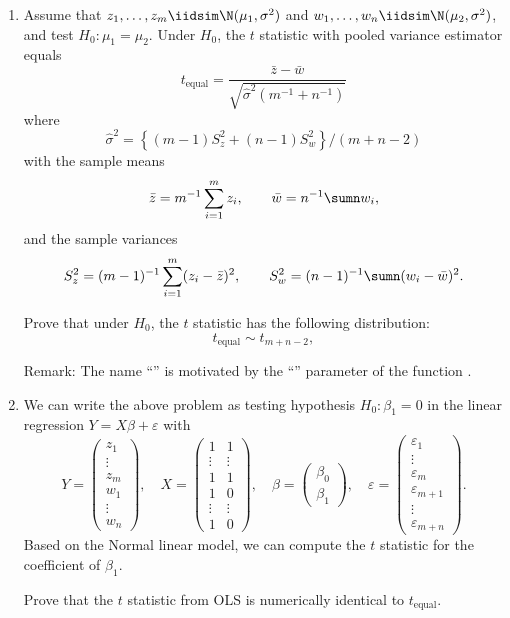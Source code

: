 \begin{enumerate}
\item Assume that $z_{1},\ldots,z_{m}\iidsim\N(\mu_{1},\sigma^{2})$ and
$w_{1},\ldots,w_{n}\iidsim\N(\mu_{2},\sigma^{2})$, and test
$H_0: \mu_{1}=\mu_{2}$. Under $H_0$, the $t$ statistic with pooled variance
estimator equals 
\[
t_{\text{equal}}=\frac{\bar{z}-\bar{w}}{  \sqrt{ \hat{\sigma}^2  (m^{-1} + n^{-1})  } } 
\] 
where 
$$
\hat{\sigma}^2 = \left\{ (m-1)S_{z}^{2}+(n-1)S_{w}^{2}\right\} /(m+n-2) 
$$
with the sample means  
\[
\bar{z}=m^{-1}\sum_{i=1}^{m}z_{i},\qquad\bar{w}=n^{-1}\sumn w_{i},
\]
and the sample variances
\[
S_{z}^{2}=(m-1)^{-1}\sum_{i=1}^{m}(z_{i}-\bar{z})^{2},\qquad S_{w}^{2}=(n-1)^{-1}\sumn(w_{i}-\bar{w})^{2}.
\]

Prove that under $H_0$, the $t$ statistic has the following distribution:
\[
t_{\text{equal}} \sim t_{m+n-2},
\] 

Remark: 
The name ``'' is motivated by the ``''
parameter of the  function .

\item We can write the above problem as testing hypothesis $H_{0}:\beta_{1}=0$ in the linear regression $Y=X\beta+\varepsilon$
with 
\[
Y=\left(\begin{array}{c}
z_{1}\\
\vdots\\
z_{m}\\
w_{1}\\
\vdots\\
w_{n}
\end{array}\right),\quad X=\left(\begin{array}{cc}
1 & 1\\
\vdots & \vdots\\
1 & 1\\
1 & 0\\
\vdots & \vdots\\
1 & 0
\end{array}\right),\quad\beta=\left(\begin{array}{c}
\beta_{0}\\
\beta_{1}
\end{array}\right),\quad\varepsilon=\left(\begin{array}{c}
\varepsilon_{1}\\
\vdots\\
\varepsilon_{m}\\
\varepsilon_{m+1}\\
\vdots\\
\varepsilon_{m+n}
\end{array}\right).
\]
Based on the Normal linear model, we can compute the $t$ statistic for the coefficient of $\beta_1$. 

Prove that the $t$ statistic from OLS is numerically identical to $t_{\text{equal}}$. 
\end{enumerate}




